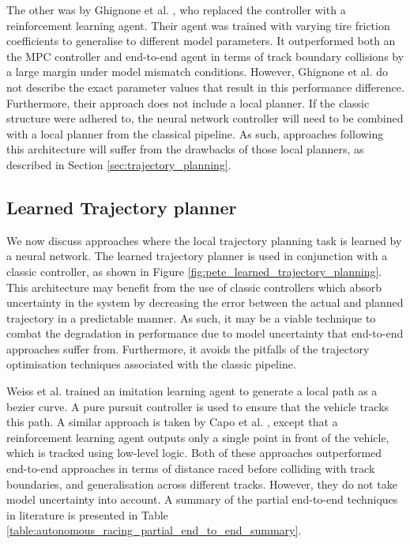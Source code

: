 The other was by Ghignone et al. \cite{Ghignone2022}, who replaced the controller with a reinforcement learning agent.
Their agent was trained with varying tire friction coefficients to generalise to different model parameters.
It outperformed both an the MPC controller and end-to-end agent in terms of track boundary collisions by a large margin under model mismatch conditions.
However, Ghignone et al. \cite{Ghignone2022} do not describe the exact parameter values that result in this performance difference.
Furthermore, their approach does not include a local planner.
If the classic structure were adhered to, the neural network controller will need to be combined with a local planner from the classical pipeline. 
As such, approaches following this architecture will suffer from the drawbacks of those local planners, as described in Section \ref{sec:trajectory_planning}.


\subsection{Learned Trajectory planner}
\label{sec:learned_planner}
We now discuss approaches where the local trajectory planning task is learned by a neural network.
The learned trajectory planner is used in conjunction with a classic controller, as shown in Figure \ref{fig:pete_learned_trajectory_planning}. 
This architecture may benefit from the use of classic controllers which absorb uncertainty in the system by decreasing the error between the actual and planned trajectory in a predictable manner.
As such, it may be a viable technique to combat the degradation in performance due to model uncertainty that end-to-end approaches suffer from. 
Furthermore, it avoids the pitfalls of the trajectory optimisation techniques associated with the classic pipeline.

Weiss et al. \cite{Weiss2020a} trained an imitation learning agent to generate a local path as a bezier curve.
A pure pursuit controller is used to ensure that the vehicle tracks this path.
A similar approach is taken by Capo et al. \cite{Capo2020}, except that a reinforcement learning agent outputs only a single point in front of the vehicle, which is tracked using low-level logic.
Both of these approaches outperformed end-to-end approaches in terms of distance raced before colliding with track boundaries, and generalisation across different tracks. However, they do not take model uncertainty into account.
A summary of the partial end-to-end techniques in literature is presented in Table \ref{table:autonomous_racing_partial_end_to_end_summary}.

